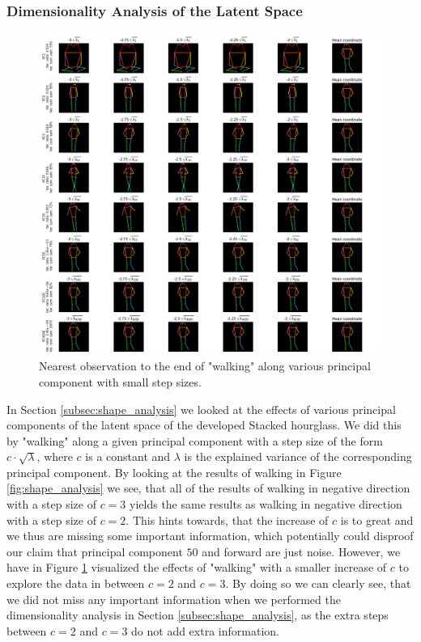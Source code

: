 \documentclass[./main.tex]{subfiles}
\begin{document}
\subsubsection{Dimensionality Analysis of the Latent Space}
\begin{figure}[htbp]
    \centering
    \includegraphics[width = \textwidth]{entities/shape_analysis_2.png}
    \caption{Nearest observation to the end of "walking" along various principal component with small step sizes.}
    \label{fig:shape_analysis_2}
\end{figure}
\noindent In Section \ref{subsec:shape_analysis} we looked at the effects of various principal components of the latent space of the developed Stacked hourglass. We did this by "walking" along a given principal component with a step size of the form $c \cdot \sqrt{\lambda}$, where $c$ is a constant and $\lambda$ is the explained variance of the corresponding principal component. By looking at the results of walking in Figure \ref{fig:shape_analysis} we see, that all of the results of walking in negative direction with a step size of $c = 3$ yields the same results as walking in negative direction with a step size of $c = 2$. This hints towards, that the increase of $c$ is to great and we thus are missing some important information, which potentially could disproof our claim that principal component $50$ and forward are just noise. However, we have in Figure \ref{fig:shape_analysis_2} visualized the effects of "walking" with a smaller increase of $c$ to explore the data in between $c = 2$ and $c = 3$. By doing so we can clearly see, that we did not miss any important information when we performed the dimensionality analysis in Section \ref{subsec:shape_analysis}, as the extra steps between $c = 2$ and $c = 3$ do not add extra information.
\end{document}
